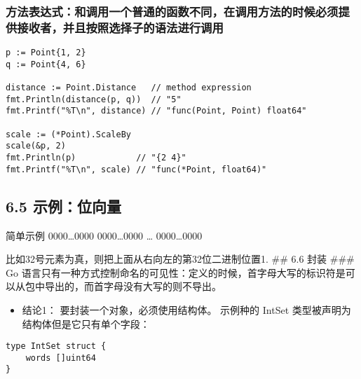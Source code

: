 \hypertarget{ux65b9ux6cd5ux8868ux8fbeux5f0fux548cux8c03ux7528ux4e00ux4e2aux666eux901aux7684ux51fdux6570ux4e0dux540cux5728ux8c03ux7528ux65b9ux6cd5ux7684ux65f6ux5019ux5fc5ux987bux63d0ux4f9bux63a5ux6536ux8005ux5e76ux4e14ux6309ux7167ux9009ux62e9ux5b50ux7684ux8bedux6cd5ux8fdbux884cux8c03ux7528}{%
\subsubsection{方法表达式：和调用一个普通的函数不同，在调用方法的时候必须提供接收者，并且按照选择子的语法进行调用}\label{ux65b9ux6cd5ux8868ux8fbeux5f0fux548cux8c03ux7528ux4e00ux4e2aux666eux901aux7684ux51fdux6570ux4e0dux540cux5728ux8c03ux7528ux65b9ux6cd5ux7684ux65f6ux5019ux5fc5ux987bux63d0ux4f9bux63a5ux6536ux8005ux5e76ux4e14ux6309ux7167ux9009ux62e9ux5b50ux7684ux8bedux6cd5ux8fdbux884cux8c03ux7528}}

\begin{verbatim}
p := Point{1, 2}
q := Point{4, 6}

distance := Point.Distance   // method expression
fmt.Println(distance(p, q))  // "5"
fmt.Printf("%T\n", distance) // "func(Point, Point) float64"

scale := (*Point).ScaleBy
scale(&p, 2)
fmt.Println(p)            // "{2 4}"
fmt.Printf("%T\n", scale) // "func(*Point, float64)"
\end{verbatim}

\hypertarget{ux793aux4f8bux4f4dux5411ux91cf}{%
\subsection{6.5 示例：位向量}\label{ux793aux4f8bux4f4dux5411ux91cf}}

简单示例 \textbar{} 0000\ldots{}0000 \textbar{} 0000\ldots{}0000
\textbar{} \ldots{} \textbar{} 0000\ldots{}0000 \textbar{}

比如32号元素为真，则把上面从右向左的第32位二进制位置1. \#\# 6.6 封装
\#\#\# Go
语言只有一种方式控制命名的可见性：定义的时候，首字母大写的标识符是可以从包中导出的，而首字母没有大写的则不导出。

\begin{itemize}
\tightlist
\item
  结论1： 要封装一个对象，必须使用结构体。 示例种的 IntSet
  类型被声明为结构体但是它只有单个字段：
\end{itemize}

\begin{verbatim}
type IntSet struct {
    words []uint64
}
\end{verbatim}

